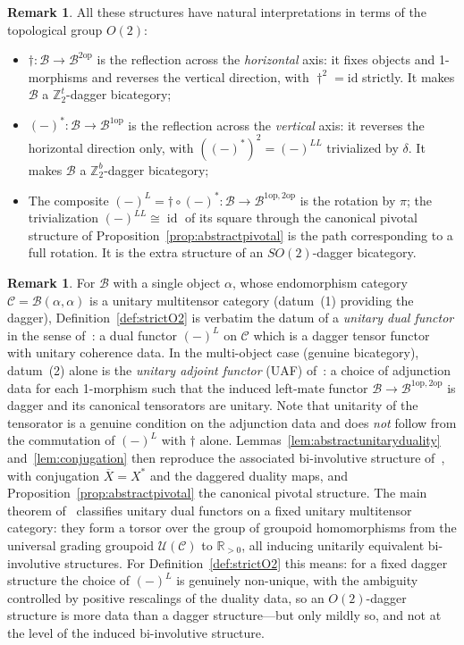 \documentclass[11pt]{article}
\theoremstyle{definition}
\newtheorem{remark}[theorem]{Remark}
\newcommand{\cB}{\mathcal{B}}
\newcommand{\cC}{\mathcal{C}}
\newcommand{\bZ}{\mathbb{Z}}
\newcommand{\op}{\mathrm{op}}
\newcommand{\SO}{SO}
\newcommand{\Or}{O} %
\newcommand{\dg}{\dagger}
\begin{document}
\begin{remark}
\label{rem:O2reflections}
All these structures have natural interpretations in terms of the topological group $\Or(2)$:
\begin{itemize}
  \item $\dg \colon \cB \to \cB^{2\op}$ is the reflection across the \emph{horizontal} axis: it fixes objects and 1-morphisms and reverses the vertical direction, with $\dg^2 = \mathrm{id}$ strictly. It makes $\cB$ a $\bZ_2^t$-dagger bicategory;
  \item $(-)^* \colon \cB \to \cB^{1\op}$ is the reflection across the \emph{vertical} axis: it reverses the horizontal direction only, with $((-)^*)^2 = (-)^{LL}$ trivialized by $\delta$. It makes $\cB$ a $\bZ_2^b$-dagger bicategory;
  \item The composite $(-)^L = \dg \circ (-)^* \colon \cB \to \cB^{1\op,2\op}$ is the rotation by $\pi$; the trivialization $(-)^{LL} \cong \operatorname{id}$ of its square through the canonical pivotal structure of Proposition~\ref{prop:abstractpivotal} is the path corresponding to a full rotation. It is the extra structure of an $\SO(2)$-dagger bicategory.
\end{itemize}
\end{remark} 

\begin{remark}
\label{rem:unitarydualfunctors}
For $\cB$ with a single object $\alpha$, whose endomorphism category $\cC = \cB(\alpha,\alpha)$ is a unitary multitensor category (datum~(1) providing the dagger), Definition~\ref{def:strictO2} is verbatim the datum of a \emph{unitary dual functor} in the sense of~\cite{Pen20}: a dual functor $(-)^L$ on $\cC$ which is a dagger tensor functor with unitary coherence data. In the multi-object case (genuine bicategory), datum~(2) alone is the \emph{unitary adjoint functor} (UAF) of~\cite{CHFHS24}: a choice of adjunction data for each 1-morphism such that the induced left-mate functor $\cB \to \cB^{1\op,2\op}$ is dagger and its canonical tensorators are unitary. Note that unitarity of the tensorator is a genuine condition on the adjunction data and does \emph{not} follow from the commutation of $(-)^L$ with $\dg$ alone. Lemmas~\ref{lem:abstractunitaryduality} and~\ref{lem:conjugation} then reproduce the associated bi-involutive structure of~\cite{HP17}, with conjugation $\overline{X} = X^*$ and the daggered duality maps, and Proposition~\ref{prop:abstractpivotal} the canonical pivotal structure. The main theorem of~\cite{Pen20} classifies unitary dual functors on a fixed unitary multitensor category: they form a torsor over the group of groupoid homomorphisms from the universal grading groupoid $\mathcal{U}(\cC)$ to $\mathbb{R}_{>0}$, all inducing unitarily equivalent bi-involutive structures. For Definition~\ref{def:strictO2} this means: for a fixed dagger structure the choice of $(-)^L$ is genuinely non-unique, with the ambiguity controlled by positive rescalings of the duality data, so an $\Or(2)$-dagger structure is more data than a dagger structure---but only mildly so, and not at the level of the induced bi-involutive structure. 
\end{remark}
\end{document}
